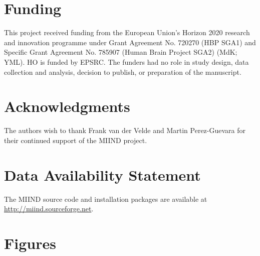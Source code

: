 \documentclass[utf8]{frontiersSCNS} %
\begin{document}
\section*{Funding}
This project received funding from the European Union’s Horizon 2020 research and innovation programme under Grant Agreement No. 720270 (HBP SGA1) and Specific Grant Agreement No. 785907 (Human Brain Project SGA2) (MdK; YML). HO is funded by EPSRC. The funders had no role in study design, data collection and analysis, decision to publish, or preparation of the manuscript.

\section*{Acknowledgments}
The authors wish to thank Frank van der Velde and Martin Perez-Guevara for their continued support of the MIIND project.

\section*{Data Availability Statement}
The MIIND source code and installation packages are available at \url{http://miind.sourceforge.net}.



\newpage


\section*{Figures}

\end{document}
